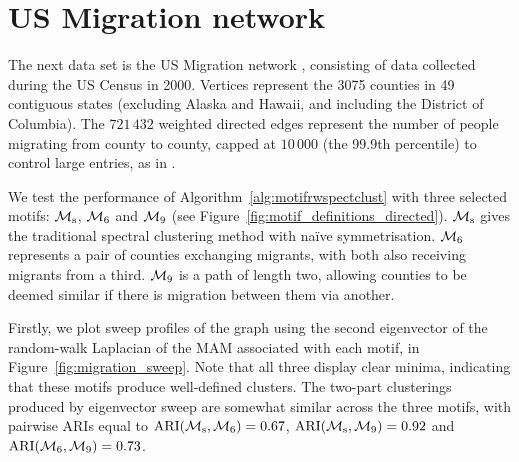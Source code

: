 









\pagebreak

\section{US Migration network} \label{sec:motif_migration}

The next data set is the US Migration network \cite{census2000}, consisting of data collected during the US Census in 2000. Vertices represent the 3075 counties in 49 contiguous states (excluding Alaska and Hawaii, and including the District of Columbia). The $721\,432$ weighted directed edges represent the number of people migrating from county to county, capped at $10 \, 000$ (the 99.9th percentile) to control large entries, as in \cite{DirectedClustImbCuts}.

We test the performance of Algorithm~\ref{alg:motifrwspectclust} with three selected motifs: $\mathcal{M}_\mathrm{s}$, $\mathcal{M}_6$ and $\mathcal{M}_9$ (see Figure~\ref{fig:motif_definitions_directed}).
$\mathcal{M}_\mathrm{s}$ gives the traditional spectral clustering method with na\"ive symmetrisation.
$\mathcal{M}_6$ represents a pair of counties exchanging migrants, with both also receiving migrants from a third.
$\mathcal{M}_9$ is a path of length two, allowing counties to be deemed similar if there is migration between them via another.

Firstly, we plot sweep profiles of the graph using the second eigenvector of the random-walk Laplacian of the MAM associated with each motif, in Figure~\ref{fig:migration_sweep}. Note that all three display clear minima, indicating that these motifs produce well-defined clusters. The two-part clusterings produced by eigenvector sweep are somewhat similar across the three motifs, with pairwise ARIs equal to $\textrm{ARI}(\mathcal{M}_\mathrm{s}, \mathcal{M}_6) = 0.67$, $\textrm{ARI}(\mathcal{M}_\mathrm{s}, \mathcal{M}_9) = 0.92$ and $\textrm{ARI}(\mathcal{M}_6, \mathcal{M}_9) = 0.73$.


